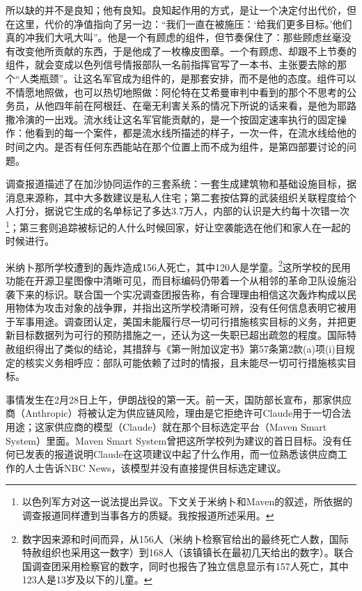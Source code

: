 所以缺的并不是良知；他有良知。良知起作用的方式，是让一个决定付出代价，但在这里，代价的净值指向了另一边：“我们一直在被施压：‘给我们更多目标。’他们真的冲我们大吼大叫”\autocite{abraham2024lavender}。他是一个有顾虑的组件，但节奏保住了：那些顾虑丝毫没有改变他所贡献的东西，于是他成了一枚橡皮图章。一个有顾虑、却跟不上节奏的组件，就会变成以色列信号情报部队一名前指挥官写了一本书、主张要去除的那个“人类瓶颈”\autocite{ys2021humanmachine}。让这名军官成为组件的，是那套安排，而不是他的态度。组件可以不情愿地照做，也可以热切地照做：阿伦特在艾希曼审判中看到的那个不思考的公务员\autocite{arendt1963eichmann}，从他四年前在阿根廷、在毫无利害关系的情况下所说的话来看，是他为耶路撒冷演的一出戏\autocite{stangneth2014eichmann}。流水线让这名军官能贡献的，是一个按固定速率执行的固定操作：他看到的每一个案件，都是流水线所描述的样子，一次一件，在流水线给他的时间之内。是否有任何东西能站在那个位置上而不成为组件，是第四部要讨论的问题。

调查报道描述了在加沙协同运作的三套系统：一套生成建筑物和基础设施目标，据消息来源称，其中大多数建议是私人住宅；第二套按估算的武装组织关联程度给个人打分，据说它生成的名单标记了多达3.7万人，内部的认识是大约每十次错一次\footnote{以色列军方对这一说法提出异议。下文关于米纳卜和Maven的叙述，所依据的调查报道同样遭到当事各方的质疑。我按报道所述采用。}；第三套则追踪被标记的人什么时候回家，好让空袭能选在他们和家人在一起的时候进行。


米纳卜那所学校遭到的轰炸造成156人死亡，其中120人是学童\autocite[第92段]{UNFFMIran2026}。\footnote{数字因来源和时间而异，从156人（米纳卜检察官给出的最终死亡人数，国际特赦组织也采用这一数字）到168人（该镇镇长在最初几天给出的数字）。联合国调查团采用检察官的数字，同时也报告了独立信息显示有157人死亡，其中123人是13岁及以下的儿童\autocite[第92–93段]{UNFFMIran2026}。}这所学校的民用功能在开源卫星图像中清晰可见，而目标编码仍带着一个从相邻的革命卫队设施沿袭下来的标识。联合国一个实况调查团报告称，有合理理由相信这次轰炸构成以民用物体为攻击对象的战争罪\autocite{ohchr2026minabpress}，并指出这所学校清晰可辨，没有任何信息表明它被用于军事用途\autocite[第81–86、124–126段]{UNFFMIran2026}。调查团认定，美国未能履行尽一切可行措施核实目标的义务，并把更新目标数据列为可行的预防措施之一，还认为这一失职已超出疏忽的程度\autocite[第124–125段]{UNFFMIran2026}。国际特赦组织得出了类似的结论，其措辞与《第一附加议定书》第57条第2款(a)项(i)目规定的核实义务相呼应：部队可能依赖了过时的情报，且未能尽一切可行措施核实目标\autocite{Amnesty2026Minab}。

事情发生在2月28日上午，伊朗战役的第一天\autocite{Amnesty2026Minab,crs2026iranwar}。前一天，国防部长宣布，那家供应商（Anthropic）将被认定为供应链风险，理由是它拒绝许可Claude用于一切合法用途；这家供应商的模型（Claude）就在那个目标选定平台（Maven Smart System）里面\autocite{npr2026openai}。Maven Smart System曾把这所学校列为建议的首日目标\autocite{livingstone2026maven,gizmodo2026minab}。没有任何已发表的报道说明Claude在这项建议中起了什么作用，而一位熟悉该供应商工作的人士告诉NBC News，该模型并没有直接提供目标选定建议\autocite{nbc2026targeting}。


